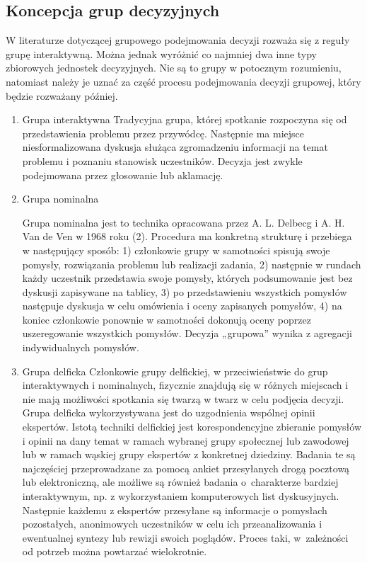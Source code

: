 \subsection{Koncepcja grup decyzyjnych}
W literaturze dotyczącej grupowego podejmowania decyzji rozważa się z reguły grupę 
interaktywną. Można jednak wyróżnić co najmniej dwa inne typy zbiorowych jednostek decyzyjnych. 
Nie są to grupy w potocznym rozumieniu, natomiast należy je uznać za część procesu podejmowania 
decyzji grupowej, który będzie rozważany później.
\begin{enumerate}[1)]
  \item Grupa interaktywna
  Tradycyjna grupa, której spotkanie rozpoczyna się od przedstawienia problemu przez 
  przywódcę. Następnie ma miejsce niesformalizowana dyskusja służąca zgromadzeniu 
  informacji na temat problemu i poznaniu stanowisk uczestników. Decyzja jest zwykle 
  podejmowana przez głosowanie lub aklamację.

  \item Grupa nominalna
  
  Grupa nominalna jest to technika opracowana przez A. L. Delbecg i A. H. Van de Ven w 1968 roku (2). 
  Procedura ma konkretną strukturę i przebiega w następujący sposób: 1) członkowie grupy w samotności 
  spisują swoje pomysły, rozwiązania problemu lub realizacji zadania, 2) następnie w rundach 
  każdy uczestnik przedstawia swoje pomysły, których podsumowanie jest bez dyskusji zapisywane 
  na tablicy, 3) po przedstawieniu wszystkich pomysłów następuje dyskusja w celu omówienia i oceny 
  zapisanych pomysłów, 4) na koniec członkowie ponownie w samotności dokonują oceny 
  poprzez uszeregowanie wszystkich pomysłów. Decyzja „grupowa” wynika z agregacji indywidualnych pomysłów.

  \item Grupa delficka
  Członkowie grupy delfickiej, w przeciwieństwie do grup
  interaktywnych i nominalnych, fizycznie znajdują się w różnych miejscach i
  nie mają możliwości spotkania się twarzą w twarz w celu podjęcia decyzji.
  Grupa delficka wykorzystywana jest do uzgodnienia wspólnej opinii ekspertów. 
  Istotą techniki delfickiej jest korespondencyjne zbieranie pomysłów i opinii 
  na dany temat w ramach wybranej grupy społecznej lub zawodowej lub w ramach 
  wąskiej grupy ekspertów z konkretnej dziedziny. Badania te są najczęściej 
  przeprowadzane za pomocą ankiet przesyłanych drogą pocztową lub elektroniczną,
  ale możliwe są również badania o charakterze bardziej interaktywnym, np.
  z wykorzystaniem  komputerowych list dyskusyjnych. Następnie każdemu z
  ekspertów przesyłane są informacje o pomysłach pozostałych, anonimowych 
  uczestników w celu ich przeanalizowania i ewentualnej syntezy lub rewizji 
  swoich poglądów. Proces taki, w zależności od potrzeb można powtarzać 
  wielokrotnie.

\end{enumerate}



